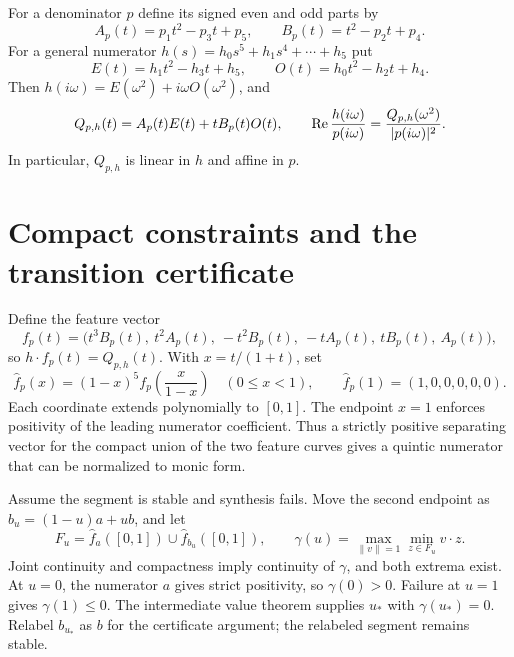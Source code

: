\documentclass[11pt]{article}
\begin{document}
For a denominator $p$ define its signed even and odd parts by
\begin{equation}\label{eq:parts}
 A_p(t)=p_1t^2-p_3t+p_5,\qquad B_p(t)=t^2-p_2t+p_4.
\end{equation}
For a general numerator $h(s)=h_0s^5+h_1s^4+\cdots+h_5$ put
\begin{equation}\label{eq:supportparts}
 E(t)=h_1t^2-h_3t+h_5,\qquad O(t)=h_0t^2-h_2t+h_4.
\end{equation}
Then $h(i\omega)=E(\omega^2)+i\omega O(\omega^2)$, and
\begin{equation}\label{eq:cross}
 Q_{p,h}(t)=A_p(t)E(t)+tB_p(t)O(t),\qquad
 \operatorname{Re}\frac{h(i\omega)}{p(i\omega)}=\frac{Q_{p,h}(\omega^2)}{|p(i\omega)|^2}.
\end{equation}
In particular, $Q_{p,h}$ is linear in $h$ and affine in $p$.

\section{Compact constraints and the transition certificate}
Define the feature vector
\begin{equation}\label{eq:feature}
 f_p(t)=\bigl(t^3B_p(t),\ t^2A_p(t),\ -t^2B_p(t),\ -tA_p(t),\ tB_p(t),\ A_p(t)\bigr),
\end{equation}
so $h\cdot f_p(t)=Q_{p,h}(t)$. With $x=t/(1+t)$, set
\[
 \widehat f_p(x)=(1-x)^5f_p\!\left(\frac{x}{1-x}\right)\quad(0\le x<1),
 \qquad \widehat f_p(1)=(1,0,0,0,0,0).
\]
Each coordinate extends polynomially to $[0,1]$. The endpoint $x=1$ enforces positivity of the leading numerator coefficient. Thus a strictly positive separating vector for the compact union of the two feature curves gives a quintic numerator that can be normalized to monic form.

Assume the segment is stable and synthesis fails. Move the second endpoint as $b_u=(1-u)a+ub$, and let
\[
 F_u=\widehat f_a([0,1])\cup\widehat f_{b_u}([0,1]),\qquad
 \gamma(u)=\max_{\|v\|=1}\min_{z\in F_u}v\cdot z.
\]
Joint continuity and compactness imply continuity of $\gamma$, and both extrema exist. At $u=0$, the numerator $a$ gives strict positivity, so $\gamma(0)>0$. Failure at $u=1$ gives $\gamma(1)\le0$. The intermediate value theorem supplies $u_*$ with $\gamma(u_*)=0$. Relabel $b_{u_*}$ as $b$ for the certificate argument; the relabeled segment remains stable.
\end{document}
